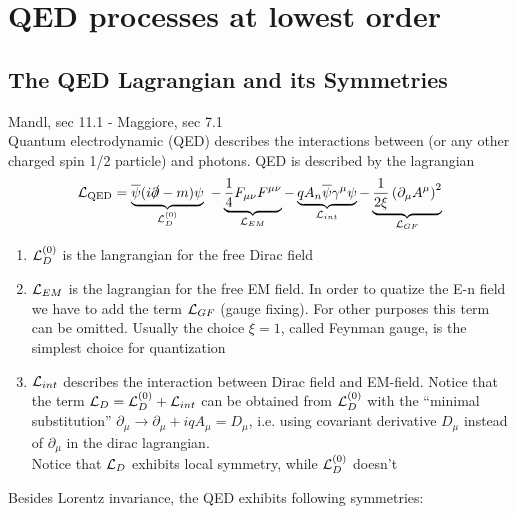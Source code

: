 \documentclass[TheoreticalPhy_ModB.tex]{subfiles}
\begin{document}
\chapter{QED processes at lowest order} %

\section{The QED Lagrangian and its Symmetries}
\textsf{Mandl, sec 11.1 - Maggiore, sec 7.1}\\
Quantum electrodynamic (QED) describes the interactions between (or any other charged spin 1/2 particle) and photons. QED is described by the lagrangian
\[
\mathcal{L}_{\text{QED}} =\underbrace{\overline{\psi }( i\slashed \partial -m) \psi }_{\mathcal{L}^{( 0)}_{D}} \ -\underbrace{\frac{1}{4} F_{\mu \nu } F^{\mu \nu }}_{\mathcal{L}_{EM}} -\underbrace{qA_{n}\overline{\psi } \gamma ^{\mu } \psi }_{\mathcal{L}_{int}} -\underbrace{\frac{1}{2\xi }\left( \partial _{\mu } A^{\mu }\right)^{2}}_{\mathcal{L}_{GF}}
\]
\begin{enumerate}
\item $\mathcal{L}_D^{(0)}$ is the langrangian for the free Dirac field
\item $\mathcal{L}_{EM}$ is the lagrangian for the free EM field. In order to quatize the E-n field we have to add the term $\mathcal{L}_{GF}$ (gauge fixing). For other purposes this term can be omitted. Usually the choice $\xi = 1$, called Feynman gauge, is the simplest choice for quantization
\item $\mathcal{L}_{int}$ describes the interaction between Dirac field and EM-field. Notice that the term $\mathcal{L}_D = \mathcal{L}_D^{(0)} + \mathcal{L}_{int}$ can be obtained from $\mathcal{L}_D^{(0)}$ with the ``minimal substitution'' $\partial_{\mu} \to \partial_{\mu} + iqA_{\mu} = D_{\mu}$, i.e. using covariant derivative $D_{\mu}$ instead of $\partial_{\mu}$ in the dirac lagrangian.\\
Notice that $\mathcal{L}_D$ exhibits local symmetry, while $\mathcal{L}_D^{(0)}$ doesn't
\end{enumerate}
Besides Lorentz invariance, the QED exhibits following symmetries:
\end{document}

